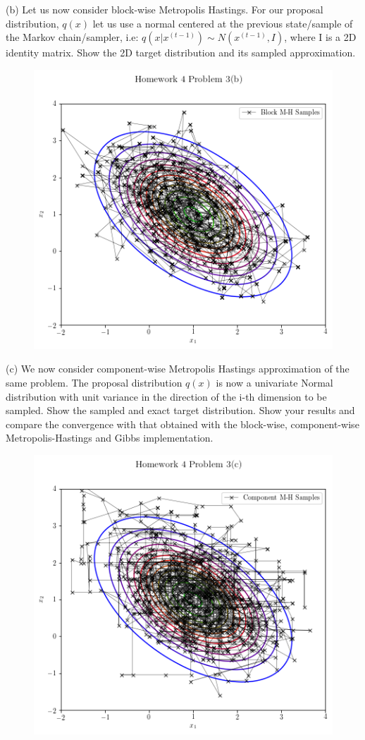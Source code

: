 \documentclass{article}
\begin{document}
(b) Let us now consider block-wise Metropolis Hastings. For our proposal distribution, $q(x)$ let us  use a normal centered at the previous state/sample of the Markov chain/sampler, i.e: $q(x|x^{(t-1)}) \sim N(x^{(t-1)}, I)$, where I is a 2D identity matrix. Show the 2D target distribution and its sampled approximation.

\begin{figure}[h!]
\centering
\includegraphics[scale=0.45]{HW4P42.png}
\caption{ }
\end{figure}

(c) We now consider component-wise Metropolis Hastings approximation of the same problem. The proposal distribution $q(x)$ is now a univariate Normal distribution with unit variance in the direction of the i-th dimension to be sampled. Show the sampled and exact target distribution.
Show your results and compare the convergence with that obtained with the block-wise, component-wise Metropolis-Hastings and Gibbs implementation.

\begin{figure}[h!]
\centering
\includegraphics[scale=0.45]{HW4P43.png}
\caption{}
\end{figure}
\end{document}
